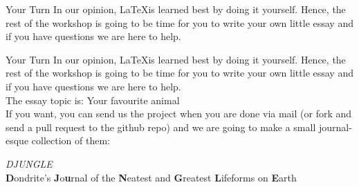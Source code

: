 \documentclass[aspectratio=169]{beamer}
\begin{document}
\begin{frame}{Your Turn}
    In our opinion, \LaTeX is learned best by doing it yourself. Hence, the rest of the workshop is going to be time for you to write your own little essay and if you have questions we are here to help.
\end{frame}

\begin{frame}{Your Turn}
    In our opinion, \LaTeX is learned best by doing it yourself. Hence, the rest of the workshop is going to be time for you to write your own little essay and if you have questions we are here to help.\\
    The essay topic is: Your favourite animal\\
    If you want, you can send us the project when you are done via mail (or fork and send a pull request to the github repo) and we are going to make a small journal-esque collection of them:\\
    \begin{center}
        \textit{\huge DJUNGLE}\\
        \textbf{D}ondrite's \textbf{J}o\textbf{u}rnal of the \textbf{N}eatest and \textbf{G}reatest \textbf{L}ifeforms on \textbf{E}arth
    \end{center}
\end{frame}
\end{document}
